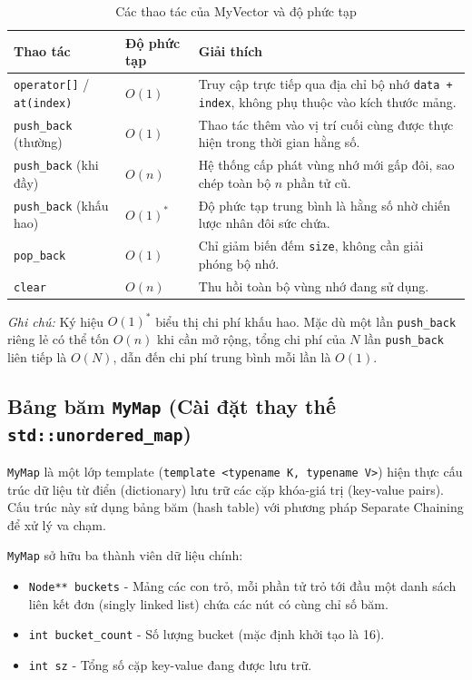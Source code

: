 \documentclass{report}
\begin{document}
\begin{table}[H]
    \centering
    \renewcommand{\arraystretch}{1.4}
    \begin{tabularx}{\textwidth}{|>{\raggedright\arraybackslash}l|l|>{\raggedright\arraybackslash}X|}
        \hline
        \textbf{Thao tác} & \textbf{Độ phức tạp} & \textbf{Giải thích} \\ \hline
        \texttt{operator[]} / \texttt{at(index)} & $O(1)$ & Truy cập trực tiếp qua địa chỉ bộ nhớ \texttt{data + index}, không phụ thuộc vào kích thước mảng. \\ \hline
        \texttt{push\_back} (thường) & $O(1)$ & Thao tác thêm vào vị trí cuối cùng được thực hiện trong thời gian hằng số. \\ \hline
        \texttt{push\_back} (khi đầy) & $O(n)$ & Hệ thống cấp phát vùng nhớ mới gấp đôi, sao chép toàn bộ $n$ phần tử cũ. \\ \hline
        \texttt{push\_back} (khấu hao) & $O(1)^*$ & Độ phức tạp trung bình là hằng số nhờ chiến lược nhân đôi sức chứa. \\ \hline
        \texttt{pop\_back} & $O(1)$ & Chỉ giảm biến đếm \texttt{size}, không cần giải phóng bộ nhớ. \\ \hline
        \texttt{clear} & $O(n)$ & Thu hồi toàn bộ vùng nhớ đang sử dụng. \\ \hline
    \end{tabularx}
    \caption{Các thao tác của MyVector và độ phức tạp}
    \label{tab:bang_minh_hoa}
\end{table}

\textit{Ghi chú:} Ký hiệu $O(1)^*$ biểu thị chi phí khấu hao. Mặc dù một lần \texttt{push\_back} riêng lẻ có thể tốn $O(n)$ khi cần mở rộng, tổng chi phí của $N$ lần \texttt{push\_back} liên tiếp là $O(N)$, dẫn đến chi phí trung bình mỗi lần là $O(1)$.

\subsection{Bảng băm \texttt{MyMap} (Cài đặt thay thế \texttt{std::unordered\_map})}

\texttt{MyMap} là một lớp template (\texttt{template <typename K, typename V>}) hiện thực cấu trúc dữ liệu từ điển (dictionary) lưu trữ các cặp khóa-giá trị (key-value pairs). Cấu trúc này sử dụng bảng băm (hash table) với phương pháp Separate Chaining để xử lý va chạm.

\texttt{MyMap} sở hữu ba thành viên dữ liệu chính:
\begin{itemize}
    \item \texttt{Node** buckets} - Mảng các con trỏ, mỗi phần tử trỏ tới đầu một danh sách liên kết đơn (singly linked list) chứa các nút có cùng chỉ số băm.
    \item \texttt{int bucket\_count} - Số lượng bucket (mặc định khởi tạo là 16).
    \item \texttt{int sz} - Tổng số cặp key-value đang được lưu trữ.
\end{itemize}
\end{document}
